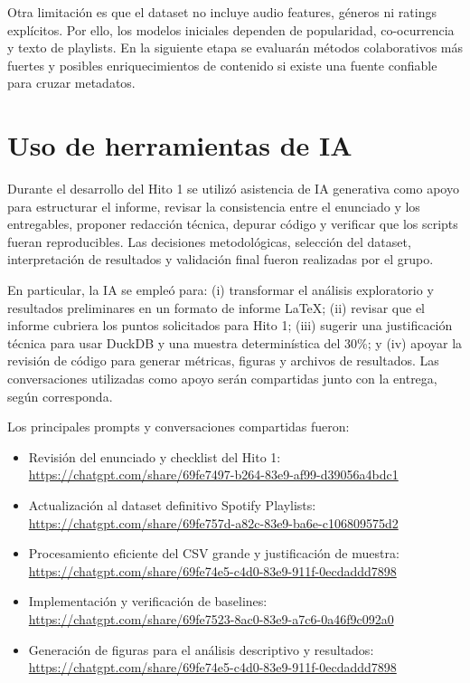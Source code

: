 \documentclass[10pt,letterpaper]{article}
\begin{document}
Otra limitación es que el dataset no incluye audio features, géneros ni ratings explícitos. Por ello, los modelos iniciales dependen de popularidad, co-ocurrencia y texto de playlists. En la siguiente etapa se evaluarán métodos colaborativos más fuertes y posibles enriquecimientos de contenido si existe una fuente confiable para cruzar metadatos.

\section{Uso de herramientas de IA}

Durante el desarrollo del Hito 1 se utilizó asistencia de IA generativa como apoyo para estructurar el informe, revisar la consistencia entre el enunciado y los entregables, proponer redacción técnica, depurar código y verificar que los scripts fueran reproducibles. Las decisiones metodológicas, selección del dataset, interpretación de resultados y validación final fueron realizadas por el grupo.

En particular, la IA se empleó para: (i) transformar el análisis exploratorio y resultados preliminares en un formato de informe LaTeX; (ii) revisar que el informe cubriera los puntos solicitados para Hito 1; (iii) sugerir una justificación técnica para usar DuckDB y una muestra determinística del 30\%; y (iv) apoyar la revisión de código para generar métricas, figuras y archivos de resultados. Las conversaciones utilizadas como apoyo serán compartidas junto con la entrega, según corresponda.

Los principales prompts y conversaciones compartidas fueron:
\begingroup
\footnotesize
\begin{itemize}
    \item Revisión del enunciado y checklist del Hito 1: \url{https://chatgpt.com/share/69fe7497-b264-83e9-af99-d39056a4bdc1}
    \item Actualización al dataset definitivo Spotify Playlists: \url{https://chatgpt.com/share/69fe757d-a82c-83e9-ba6e-c106809575d2}
    \item Procesamiento eficiente del CSV grande y justificación de muestra: \url{https://chatgpt.com/share/69fe74e5-c4d0-83e9-911f-0ecdaddd7898}
    \item Implementación y verificación de baselines: \url{https://chatgpt.com/share/69fe7523-8ac0-83e9-a7c6-0a46f9c092a0}
    \item Generación de figuras para el análisis descriptivo y resultados: \url{https://chatgpt.com/share/69fe74e5-c4d0-83e9-911f-0ecdaddd7898}
\end{itemize}
\endgroup
\end{document}
